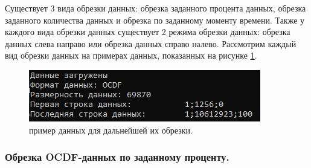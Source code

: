 {\standartFont

  \par Существует 3 вида обрезки данных: обрезка заданного процента данных, обрезка заданного количества данных и обрезка по заданному моменту времени. Также у каждого вида обрезки данных существует 2 режима обрезки данных: обрезка данных слева направо или обрезка данных справо налево. Рассмотрим каждый вид обрезки данных на примерах данных, показанных на рисунке \ref{fig:ExOCDFdataForCating}. 

  \begin{figure}[H]
    \centering
    \includegraphics{images/forDataManipulator/ExOCDFdataForCating.png}
    \caption{пример данных для дальнейшей их обрезки.} 
    \label{fig:ExOCDFdataForCating}
  \end{figure}

  \par
}

\subsubsection{ \standartTitleFont
  Обрезка OCDF-данных по заданному проценту. 
} \label{subsubsec:OCDFCutPer}

